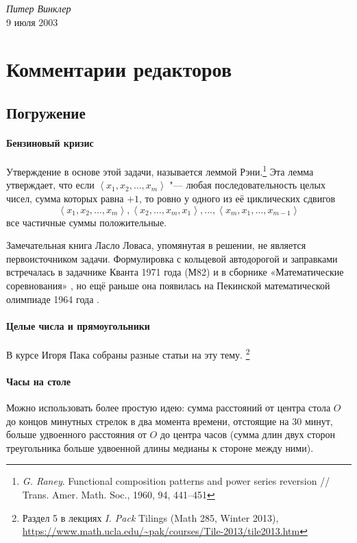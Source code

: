 \documentclass[twoside]{book}
\begin{document}
\begin{flushright}
\emph{Питер Винклер}
\\
9 июля 2003
\end{flushright}

\appendix

\chapter{Комментарии редакторов}

\section{Погружение}

\subsubsection*{Бензиновый кризис} %
Утверждение в основе этой задачи, называется леммой Рэни.\footnote{\emph{G. Raney}. Functional composition patterns and power series reversion /\!/ Trans. Amer. Math. Soc., 1960, 94, 441--451}
Эта лемма утверждает, что если 
$\left<x_1, x_2,\ldots, x_m\right>$ "--- любая последовательность целых чисел, сумма 
которых равна $+1$, то ровно у одного из её циклических сдвигов 
$$\left<x_1, x_2,\ldots , x_m\right>, \left<x_2, \ldots, x_m, x_1\right>, \ldots, \left<x_m, x_1, \ldots, x_{m-1}\right>$$
все частичные суммы  положительные. 

Замечательная книга Ласло Ловаса, упомянутая в решении, не является первоисточником задачи.
Формулировка с кольцевой автодорогой и заправками встречалась в задачнике Кванта 1971 года (М82)
и в сборнике «Математические соревнования» \cite[задачи 76 и 77]{матсоревнования}, но ещё раньше она появилась на Пекинской математической олимпиаде 1964 года \cite[№26.6]{зарубежные}.


\subsubsection*{Целые числа и прямоугольники} %
В курсе Игоря Пака собраны разные статьи на эту тему.%
\footnote{Раздел 5 в лекциях \emph{I. Pack} Tilings (Math 285, Winter 2013), \url{https://www.math.ucla.edu/~pak/courses/Tile-2013/tile2013.htm}}

\subsubsection*{Часы на столе} %
Можно использовать более простую идею: сумма расстояний от центра стола $O$ до концов минутных стрелок в два момента времени, отстоящие на 30 минут, больше удвоенного расстояния от $O$ до центра часов (сумма длин двух сторон треугольника больше удвоенной длины медианы к стороне между ними).
\end{document}
